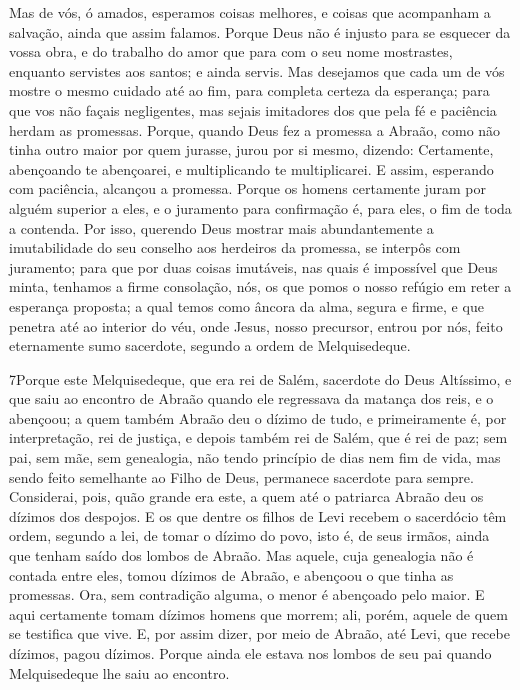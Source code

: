 Mas de vós, ó amados, esperamos coisas melhores, e coisas que
acompanham a salvação, ainda que assim falamos. Porque Deus
não é injusto para se esquecer da vossa obra, e do trabalho do amor
que para com o seu nome mostrastes, enquanto servistes aos santos; e
ainda servis. Mas desejamos que cada um de vós mostre o mesmo
cuidado até ao fim, para completa certeza da esperança; para
que vos não façais negligentes, mas sejais imitadores dos que pela
fé e paciência herdam as promessas. Porque, quando Deus fez a
promessa a Abraão, como não tinha outro maior por quem jurasse,
jurou por si mesmo, dizendo: Certamente, abençoando te
abençoarei, e multiplicando te multiplicarei. E assim,
esperando com paciência, alcançou a promessa. Porque os
homens certamente juram por alguém superior a eles, e o juramento
para confirmação é, para eles, o fim de toda a contenda. Por
isso, querendo Deus mostrar mais abundantemente a imutabilidade do
seu conselho aos herdeiros da promessa, se interpôs com juramento;
para que por duas coisas imutáveis, nas quais é impossível
que Deus minta, tenhamos a firme consolação, nós, os que pomos o
nosso refúgio em reter a esperança proposta; a qual temos
como âncora da alma, segura e firme, e que penetra até ao interior
do véu, onde Jesus, nosso precursor, entrou por nós, feito
eternamente sumo sacerdote, segundo a ordem de Melquisedeque.

\medskip

\lettrine{7} Porque este Melquisedeque, que era rei de Salém,
sacerdote do Deus Altíssimo, e que saiu ao encontro de Abraão quando
ele regressava da matança dos reis, e o abençoou; a quem também
Abraão deu o dízimo de tudo, e primeiramente é, por interpretação,
rei de justiça, e depois também rei de Salém, que é rei de paz;
sem pai, sem mãe, sem genealogia, não tendo princípio de dias
nem fim de vida, mas sendo feito semelhante ao Filho de Deus,
permanece sacerdote para sempre. Considerai, pois, quão grande
era este, a quem até o patriarca Abraão deu os dízimos dos despojos.
E os que dentre os filhos de Levi recebem o sacerdócio têm
ordem, segundo a lei, de tomar o dízimo do povo, isto é, de seus
irmãos, ainda que tenham saído dos lombos de Abraão. Mas aquele,
cuja genealogia não é contada entre eles, tomou dízimos de Abraão, e
abençoou o que tinha as promessas. Ora, sem contradição alguma,
o menor é abençoado pelo maior. E aqui certamente tomam dízimos
homens que morrem; ali, porém, aquele de quem se testifica que vive.
E, por assim dizer, por meio de Abraão, até Levi, que recebe
dízimos, pagou dízimos. Porque ainda ele estava nos lombos de
seu pai quando Melquisedeque lhe saiu ao encontro.

